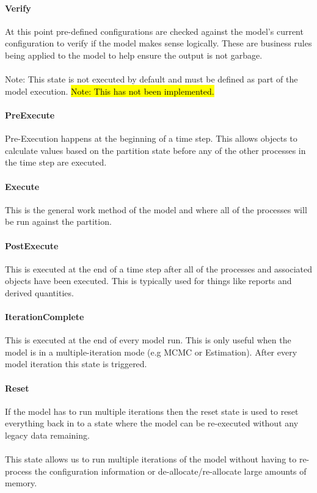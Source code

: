 \paragraph*{Verify}
At this point pre-defined configurations are checked against the model's current configuration to verify if the model makes sense logically. These are business rules being applied to the model to help ensure the output is not garbage.
\\\\
Note: This state is not executed by default and must be defined as part of the model execution.
\hl{Note: This has not been implemented.}
\paragraph*{PreExecute}
Pre-Execution happens at the beginning of a time step. This allows objects to calculate values based on the partition state before any of the other processes in the time step are executed.
\paragraph*{Execute}
This is the general work method of the model and where all of the processes will be run against the partition.
\paragraph*{PostExecute}
This is executed at the end of a time step after all of the processes and associated objects have been executed. This is typically used for things like reports and derived quantities.

\paragraph*{IterationComplete}
This is executed at the end of every model run. This is only useful when the model is in a multiple-iteration mode (e.g MCMC or Estimation). After every model iteration this state is triggered.

\paragraph*{Reset}
If the model has to run multiple iterations then the reset state is used to reset everything back in to a state where the model can be re-executed without any legacy data remaining.
\\\\
This state allows us to run multiple iterations of the model without having to re-process the configuration information or de-allocate/re-allocate large amounts of memory.


